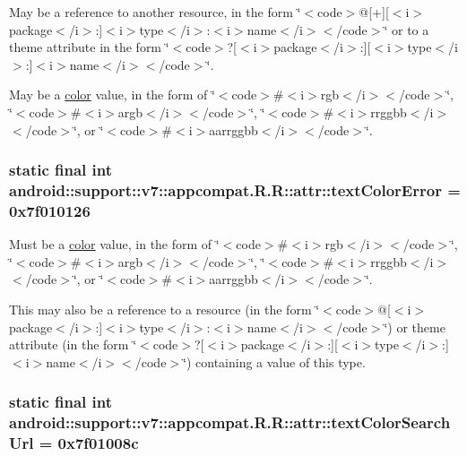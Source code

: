 May be a reference to another resource, in the form \char`\"{}$<$code$>$@\mbox{[}+\mbox{]}\mbox{[}$<$i$>$package$<$/i$>$:\mbox{]}$<$i$>$type$<$/i$>$:$<$i$>$name$<$/i$>$$<$/code$>$\char`\"{} or to a theme attribute in the form \char`\"{}$<$code$>$?\mbox{[}$<$i$>$package$<$/i$>$:\mbox{]}\mbox{[}$<$i$>$type$<$/i$>$:\mbox{]}$<$i$>$name$<$/i$>$$<$/code$>$\char`\"{}. 

May be a \hyperlink{classandroid_1_1support_1_1v7_1_1appcompat_1_1_r_1_1color}{color} value, in the form of \char`\"{}$<$code$>$\#$<$i$>$rgb$<$/i$>$$<$/code$>$\char`\"{}, \char`\"{}$<$code$>$\#$<$i$>$argb$<$/i$>$$<$/code$>$\char`\"{}, \char`\"{}$<$code$>$\#$<$i$>$rrggbb$<$/i$>$$<$/code$>$\char`\"{}, or \char`\"{}$<$code$>$\#$<$i$>$aarrggbb$<$/i$>$$<$/code$>$\char`\"{}. \hypertarget{classandroid_1_1support_1_1v7_1_1appcompat_1_1_r_1_1attr_f3ae62d791202b8899f4ae3dd1817342}{
\subsubsection[{textColorError}]{\setlength{\rightskip}{0pt plus 5cm}static final int android::support::v7::appcompat.R.R::attr::textColorError = 0x7f010126}}
\label{classandroid_1_1support_1_1v7_1_1appcompat_1_1_r_1_1attr_f3ae62d791202b8899f4ae3dd1817342}


Must be a \hyperlink{classandroid_1_1support_1_1v7_1_1appcompat_1_1_r_1_1color}{color} value, in the form of \char`\"{}$<$code$>$\#$<$i$>$rgb$<$/i$>$$<$/code$>$\char`\"{}, \char`\"{}$<$code$>$\#$<$i$>$argb$<$/i$>$$<$/code$>$\char`\"{}, \char`\"{}$<$code$>$\#$<$i$>$rrggbb$<$/i$>$$<$/code$>$\char`\"{}, or \char`\"{}$<$code$>$\#$<$i$>$aarrggbb$<$/i$>$$<$/code$>$\char`\"{}. 

This may also be a reference to a resource (in the form \char`\"{}$<$code$>$@\mbox{[}$<$i$>$package$<$/i$>$:\mbox{]}$<$i$>$type$<$/i$>$:$<$i$>$name$<$/i$>$$<$/code$>$\char`\"{}) or theme attribute (in the form \char`\"{}$<$code$>$?\mbox{[}$<$i$>$package$<$/i$>$:\mbox{]}\mbox{[}$<$i$>$type$<$/i$>$:\mbox{]}$<$i$>$name$<$/i$>$$<$/code$>$\char`\"{}) containing a value of this type. \hypertarget{classandroid_1_1support_1_1v7_1_1appcompat_1_1_r_1_1attr_412c07b23d2c7d8d499663d944fe9d53}{
\subsubsection[{textColorSearchUrl}]{\setlength{\rightskip}{0pt plus 5cm}static final int android::support::v7::appcompat.R.R::attr::textColorSearchUrl = 0x7f01008c}}
\label{classandroid_1_1support_1_1v7_1_1appcompat_1_1_r_1_1attr_412c07b23d2c7d8d499663d944fe9d53}


